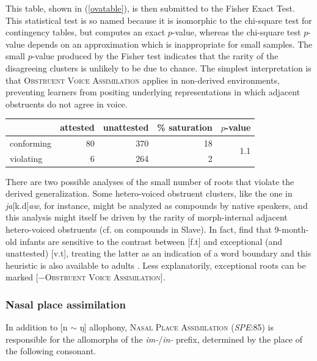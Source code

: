 This table, shown in (\ref{ovatable}), is then submitted to the Fisher Exact Test. This statistical test is so named because it is isomorphic to the chi-square test 
for contingency tables, but computes an exact $p$-value, whereas the chi-square test $p$-value depends on an approximation which is inappropriate for small samples. The small $p$-value produced by the Fisher test indicates that the rarity of the disagreeing clusters is unlikely to be due to chance. The simplest interpretation is that \textsc{Obstruent Voice Assimilation} applies in non-derived environments, preventing learners from positing underlying representations in which adjacent obstruents do not agree in voice.

\begin{example} \label{ovatable}
\begin{tabular}{l r r r r}
\toprule
           & attested & unattested & \% saturation & $p$-value                   \\
\midrule
conforming & 80       & 370        & 18          & \multirow{2}{*}{1.1\e{-11}} \\
violating  &  6       & 264        & 2           \\
\bottomrule
\end{tabular}
\end{example}

There are two possible analyses of the small number of roots that violate the derived generalization. Some hetero-voiced obstruent clusters, like the one in \emph{ja}[k.d]\emph{aw}, for instance, might be analyzed as compounds by native speakers, and this analysis might itself be driven by the rarity of morph-internal adjacent hetero-voiced obstruents (cf. \citealp[546]{Rice2009d} on compounds in Slave). In fact, \citet{Mattys2001b} find that 9-month-old infants are sensitive to the contrast between [f.t] and exceptional (and unattested) [v.t], treating the latter as an indication of a word boundary and this heuristic is also available to adults \citep{Brown1956,McQueen1998b}. Less explanatorily, exceptional roots can be marked [$-$\textsc{Obstruent Voice Assimilation}].

\subsubsection{Nasal place assimilation} 
\label{npa}

In addition to [n $\sim$ ŋ] allophony, \textsc{Nasal Place Assimilation} (\emph{SPE}:85) is responsible for the allomorphs of the \emph{im-}/\emph{in-} prefix, determined by the place of the following consonant.

